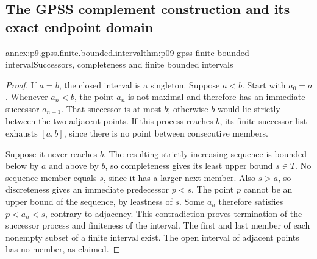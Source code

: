 
\subsection{The GPSS complement construction and its exact endpoint domain}
\label{sec:annex-p09-gpss-decomposition-complement}

\begin{annexitem}{annex:p9.gpss.finite.bounded.interval}{thm:p09-gpss-finite-bounded-interval}{Successors, completeness and finite bounded intervals}
\begin{proof}
If \(a=b\), the closed interval is a singleton. Suppose
\(a<b\). Start with \(a_0=a\). Whenever \(a_n<b\),
the point \(a_n\) is not maximal and therefore has an
immediate successor \(a_{n+1}\). That successor is at
most \(b\); otherwise \(b\) would lie strictly between
the two adjacent points. If this process reaches \(b\),
its finite successor list exhausts \([a,b]\), since
there is no point between consecutive members.

Suppose it never reaches \(b\). The resulting strictly
increasing sequence is bounded below by \(a\) and above
by \(b\), so completeness gives its least upper bound
\(s\in T\). No sequence member equals \(s\), since
it has a larger next member. Also \(s>a\), so discreteness
gives an immediate predecessor \(p<s\). The point
\(p\) cannot be an upper bound of the sequence, by
leastness of \(s\). Some \(a_n\) therefore satisfies
\(p<a_n<s\), contrary to adjacency. This contradiction
proves termination of the successor process and finiteness
of the interval. The first and last member of each nonempty
subset of a finite interval exist. The open interval of
adjacent points has no member, as claimed.
\end{proof}
\end{annexitem}

